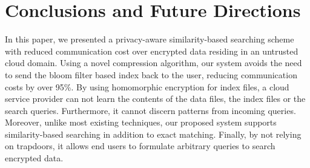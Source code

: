 

\section{Conclusions and Future Directions}
\label{sec:conclusion}

In this paper, we presented a privacy-aware similarity-based searching scheme
with reduced communication cost over encrypted data residing in an untrusted
cloud domain. Using a novel compression 
algorithm, our system avoids the need to send the bloom filter based index back to the 
user, reducing communication costs by over 95\%.
By using homomorphic encryption for index files, a cloud service provider can not 
learn the contents of 
the data files, the index files or the search queries. Furthermore, it cannot 
discern patterns from incoming queries. Moreover, unlike most existing techniques, our
proposed system supports similarity-based searching in addition to exact matching.
Finally, by not relying on trapdoors, it allows end users to formulate
arbitrary queries to search encrypted data.

